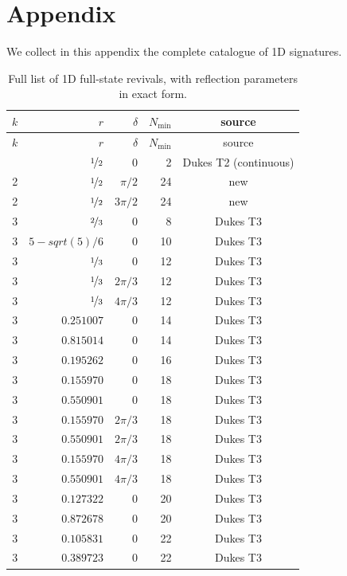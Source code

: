 \documentclass[aps,pra,reprint,amsmath,amssymb,superscriptaddress,floatfix]{revtex4-2}
\def\frac#1#2{#1/#2}%
\def\rho{r}%
\def\sqrt#1{sqrt(#1)}%
\begin{document}
\section{\label{sec:appendix}Appendix}\par
We collect in this appendix the complete catalogue of 1D signatures.
\par
\clearpage
\begin{longtable}{rrrrc}
\caption{Full list of 1D full-state revivals, with reflection parameters in exact form.}\label{tab:1d-catalogue-exact} \\
\toprule
$k$ & $\rho$ & $\delta$ & $N_{\min}$ & source \\
\midrule
\endfirsthead
\toprule
$k$ & $\rho$ & $\delta$ & $N_{\min}$ & source \\
\midrule
\endhead
\bottomrule
\endfoot
2 & $\nicefrac{1}{2}$ & $0$ & 2 & Dukes T2 (continuous) \\
2 & $\nicefrac{1}{2}$ & $\pi/2$ & 24 & new \\
2 & $\nicefrac{1}{2}$ & $3\pi/2$ & 24 & new \\
3 & $\nicefrac{2}{3}$ & $0$ & 8 & Dukes T3 \\
3 & $\frac{5 - \sqrt{5}}{6}$ & $0$ & 10 & Dukes T3 \\
3 & $\nicefrac{1}{3}$ & $0$ & 12 & Dukes T3 \\
3 & $\nicefrac{1}{3}$ & $2\pi/3$ & 12 & Dukes T3 \\
3 & $\nicefrac{1}{3}$ & $4\pi/3$ & 12 & Dukes T3 \\
3 & $0.251007$ & $0$ & 14 & Dukes T3 \\
3 & $0.815014$ & $0$ & 14 & Dukes T3 \\
3 & $0.195262$ & $0$ & 16 & Dukes T3 \\
3 & $0.155970$ & $0$ & 18 & Dukes T3 \\
3 & $0.550901$ & $0$ & 18 & Dukes T3 \\
3 & $0.155970$ & $2\pi/3$ & 18 & Dukes T3 \\
3 & $0.550901$ & $2\pi/3$ & 18 & Dukes T3 \\
3 & $0.155970$ & $4\pi/3$ & 18 & Dukes T3 \\
3 & $0.550901$ & $4\pi/3$ & 18 & Dukes T3 \\
3 & $0.127322$ & $0$ & 20 & Dukes T3 \\
3 & $0.872678$ & $0$ & 20 & Dukes T3 \\
3 & $0.105831$ & $0$ & 22 & Dukes T3 \\
3 & $0.389723$ & $0$ & 22 & Dukes T3 \\

\end{longtable}
\end{document}
